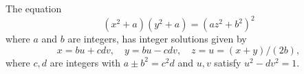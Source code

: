 \begin{proposition}\label{eq:158}
    The equation
\[
    (x^2+a)(y^2+a)=(az^2+b^2)^2
\]
    where $a$ and $b$ are integers, has integer solutions given by
\[
    x=bu+cdv,\quad y=bu-cdv,\quad z=u=(x+y)/(2b),
\]
    where $c,d$ are integers with $a\pm b^2=c^2d$ and $u,v$ satisfy $u^2-dv^2=1$.
\end{proposition}
